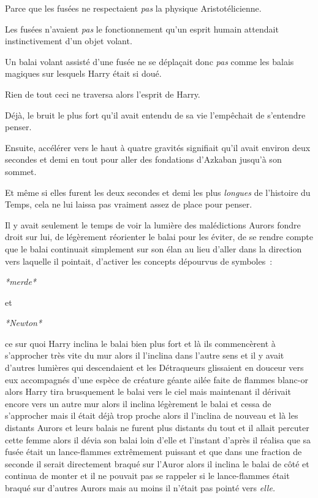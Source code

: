 Parce que les fusées ne respectaient \emph{pas} la physique Aristotélicienne.

Les fusées n'avaient \emph{pas} le fonctionnement qu'un esprit humain attendait instinctivement d'un objet volant.

Un balai volant assisté d'une fusée ne se déplaçait donc \emph{pas} comme les balais magiques sur lesquels Harry était si doué.

Rien de tout ceci ne traversa alors l'esprit de Harry.

Déjà, le bruit le plus fort qu'il avait entendu de sa vie l'empêchait de s'entendre penser.

Ensuite, accélérer vers le haut à quatre gravités signifiait qu'il avait environ deux secondes et demi en tout pour aller des fondations d'Azkaban jusqu'à son sommet.

Et même si elles furent les deux secondes et demi les plus \emph{longues} de l'histoire du Temps, cela ne lui laissa pas vraiment assez de place pour penser.

Il y avait seulement le temps de voir la lumière des malédictions Aurors fondre droit sur lui, de légèrement réorienter le balai pour les éviter, de se rendre compte que le balai continuait simplement sur son élan au lieu d'aller dans la direction vers laquelle il pointait, d'activer les concepts dépourvus de symboles~:

\emph{*merde*}

et

\emph{*Newton*}

ce sur quoi Harry inclina le balai bien plus fort et là ils commencèrent à s'approcher très vite du mur alors il l'inclina dans l'autre sens et il y avait d'autres lumières qui descendaient et les Détraqueurs glissaient en douceur vers eux accompagnés d'une espèce de créature géante ailée faite de flammes blanc-or alors Harry tira brusquement le balai vers le ciel mais maintenant il dérivait encore vers un autre mur alors il inclina légèrement le balai et cessa de s'approcher mais il était déjà trop proche alors il l'inclina de nouveau et là les distants Aurors et leurs balais ne furent plus distants du tout et il allait percuter cette femme alors il dévia son balai loin d'elle et l'instant d'après il réalisa que sa fusée était un lance-flammes extrêmement puissant et que dans une fraction de seconde il serait directement braqué sur l'Auror alors il inclina le balai de côté et continua de monter et il ne pouvait pas se rappeler si le lance-flammes était braqué sur d'autres Aurors mais au moins il n'était pas pointé vers \emph{elle.}


